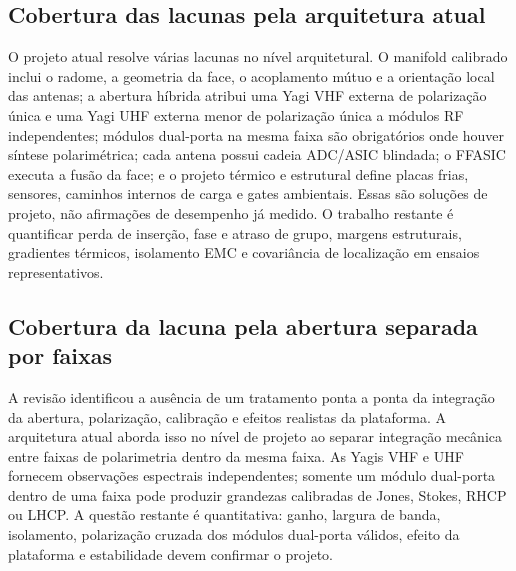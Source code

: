 \subsection*{Cobertura das lacunas pela arquitetura atual}
O projeto atual resolve várias lacunas no nível arquitetural. O manifold calibrado inclui o radome, a geometria da face, o acoplamento mútuo e a orientação local das antenas; a abertura híbrida atribui uma Yagi VHF externa de polarização única e uma Yagi UHF externa menor de polarização única a módulos RF independentes; módulos dual-porta na mesma faixa são obrigatórios onde houver síntese polarimétrica; cada antena possui cadeia ADC/ASIC blindada; o FFASIC executa a fusão da face; e o projeto térmico e estrutural define placas frias, sensores, caminhos internos de carga e gates ambientais. Essas são soluções de projeto, não afirmações de desempenho já medido. O trabalho restante é quantificar perda de inserção, fase e atraso de grupo, margens estruturais, gradientes térmicos, isolamento EMC e covariância de localização em ensaios representativos.

\subsection*{Cobertura da lacuna pela abertura separada por faixas}
A revisão identificou a ausência de um tratamento ponta a ponta da integração da abertura, polarização, calibração e efeitos realistas da plataforma. A arquitetura atual aborda isso no nível de projeto ao separar integração mecânica entre faixas de polarimetria dentro da mesma faixa. As Yagis VHF e UHF fornecem observações espectrais independentes; somente um módulo dual-porta dentro de uma faixa pode produzir grandezas calibradas de Jones, Stokes, RHCP ou LHCP. A questão restante é quantitativa: ganho, largura de banda, isolamento, polarização cruzada dos módulos dual-porta válidos, efeito da plataforma e estabilidade devem confirmar o projeto.
